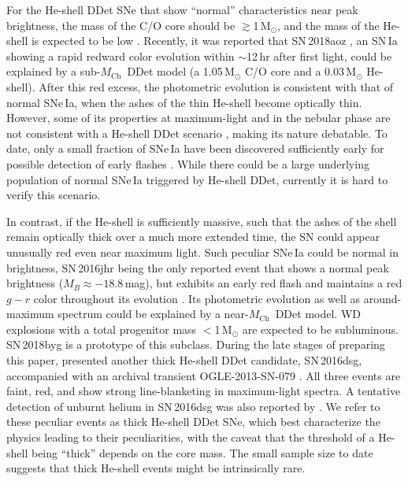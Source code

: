 \documentclass[twocolumn]{aastex631}
\newcommand{\Mch}{$M_\mathrm{Ch}$}
\begin{document}
For the He-shell DDet SNe that show ``normal'' characteristics near peak brightness, the mass of the C/O core should be $\gtrsim$1\,$\mathrm{M_\odot}$, and the mass of the He-shell is expected to be low \citep[$\lesssim$0.03\,$\mathrm{M_\odot}$;][]{polin_observational_2019,Magee_2021,Shen_2D_2021}. Recently, it was reported that SN\,2018aoz \citep{Ni_2022}, an SN\,Ia showing a rapid redward color evolution within $\sim$12\,hr after first light, could be explained by a sub-\Mch\ DDet model (a 1.05\,$\mathrm{M_\odot}$ C/O core and a 0.03\,$\mathrm{M_\odot}$ He-shell). After this red excess, the photometric evolution is consistent with that of normal SNe\,Ia, when the ashes of the thin He-shell become optically thin. However, some of its properties at maximum-light and in the nebular phase are not consistent with a He-shell DDet scenario \citep{Ni_2022b}, making its nature debatable. To date, only a small fraction of SNe\,Ia have been discovered sufficiently early for possible detection of early flashes \citep[e.g.,][]{Deckers_2022}. While there could be a large underlying population of normal SNe\,Ia triggered by He-shell DDet, currently it is hard to verify this scenario. 

In contrast, if the He-shell is sufficiently massive, such that the ashes of the shell remain optically thick over a much more extended time, the SN could appear unusually red even near maximum light. Such peculiar SNe\,Ia could be normal in brightness, SN\,2016jhr being the only reported event that shows a normal peak brightness ($M_B\approx-18.8$\,mag), but exhibits an early red flash and maintains a red $g-r$ color throughout its evolution \citep{jiang_16jhr_2017}. Its photometric evolution as well as around-maximum spectrum could be explained by a near-\Mch\ DDet model. %
WD explosions with a total progenitor mass $<$1\,$\mathrm{M_\odot}$ are expected to be subluminous. SN\,2018byg \citep{de_18byg_2019} is a prototype of this subclass. During the late stages of preparing this paper, \citet{Dong_16dsg_2022} presented another thick He-shell DDet candidate, SN\,2016dsg, accompanied with an archival transient OGLE-2013-SN-079 \citep{Inserra_OGLE13_079_2015}. All three events are faint, red, and show strong line-blanketing in maximum-light spectra. A tentative detection of unburnt helium in SN\,2016dsg was also reported by \citet{Dong_16dsg_2022}. We refer to these peculiar events as thick He-shell DDet SNe, which best characterize the physics leading to their peculiarities, with the caveat that the threshold of a He-shell being ``thick'' depends on the core mass. The small sample size to date suggests that thick He-shell events might be intrinsically rare.
\end{document}
